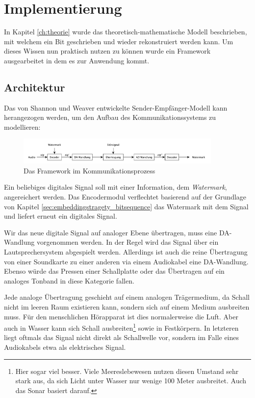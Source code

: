 \chapter{Implementierung}
\label{ch:methode}

In Kapitel \ref{ch:theorie} wurde das theoretisch-mathematische Modell beschrieben, mit welchem ein Bit geschrieben und wieder rekonstruiert werden kann. Um dieses Wissen nun praktisch nutzen zu können wurde ein Framework ausgearbeitet in dem es zur Anwendung kommt. 

\section{Architektur}

Das von Shannon und Weaver entwickelte Sender-Empfänger-Modell \cite{shannon2001mathematical} kann herangezogen werden, um den Aufbau des Kommunikationssystems zu modellieren:

\begin{figure}[h]
	\centering
	\includegraphics[width=0.9\textwidth]{figures/diagram-framework.pdf}
	\caption{Das Framework im Kommunikationsprozess}
	\label{fig:diagram-framework}
\end{figure}

Ein beliebiges digitales Signal soll mit einer Information, dem \textit{Watermark}, angereichert werden. Das Encodermodul verflechtet basierend auf der Grundlage von Kapitel \ref{sec:embeddingstragety_bitsequence} das Watermark mit dem Signal und liefert erneut ein digitales Signal.

Wir das neue digitale Signal auf analoger Ebene übertragen, muss eine DA-Wandlung vorgenommen werden. In der Regel wird das Signal über ein Lautsprechersystem abgespielt werden. Allerdings ist auch die reine Übertragung von einer Soundkarte zu einer anderen via einem Audiokabel eine DA-Wandlung. Ebenso würde das Pressen einer Schallplatte oder das Übertragen auf ein analoges Tonband in diese Kategorie fallen. 

Jede analoge Übertragung geschieht auf einem analogen Trägermedium, da Schall nicht im leeren Raum existieren kann, sondern sich auf einem Medium ausbreiten muss. Für den menschlichen Hörapparat ist dies normalerweise die Luft. Aber auch in Wasser kann sich Schall ausbreiten\footnote{Hier sogar viel besser. Viele Meereslebewesen nutzen diesen Umstand sehr stark aus, da sich Licht unter Wasser nur wenige 100 Meter ausbreitet. Auch das Sonar basiert darauf.} sowie in Festkörpern. In letzteren liegt oftmals das Signal nicht direkt als Schallwelle vor, sondern im Falle eines Audiokabels etwa als elektrisches Signal. 

